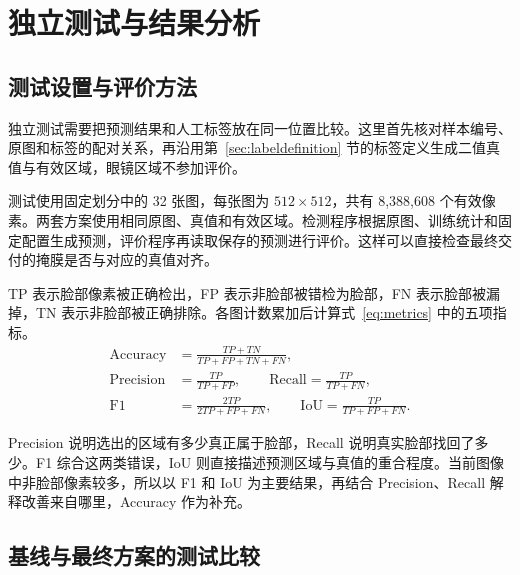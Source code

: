 \section{独立测试与结果分析}
\subsection{测试设置与评价方法}

独立测试需要把预测结果和人工标签放在同一位置比较。这里首先核对样本编号、原图和标签的配对关系，再沿用第~\ref{sec:labeldefinition} 节的标签定义生成二值真值与有效区域，眼镜区域不参加评价。

测试使用固定划分中的 32 张图，每张图为 $512\times512$，共有 8,388,608 个有效像素。两套方案使用相同原图、真值和有效区域。检测程序根据原图、训练统计和固定配置生成预测，评价程序再读取保存的预测进行评价。这样可以直接检查最终交付的掩膜是否与对应的真值对齐。

TP 表示脸部像素被正确检出，FP 表示非脸部被错检为脸部，FN 表示脸部被漏掉，TN 表示非脸部被正确排除。各图计数累加后计算式~\eqref{eq:metrics} 中的五项指标。
\begin{equation}
\begin{aligned}
\mathrm{Accuracy}&=\frac{TP+TN}{TP+FP+TN+FN},\\
\mathrm{Precision}&=\frac{TP}{TP+FP},\qquad
\mathrm{Recall}=\frac{TP}{TP+FN},\\
\mathrm{F1}&=\frac{2TP}{2TP+FP+FN},\qquad
\mathrm{IoU}=\frac{TP}{TP+FP+FN}.
\end{aligned}
\label{eq:metrics}
\end{equation}

Precision 说明选出的区域有多少真正属于脸部，Recall 说明真实脸部找回了多少。F1 综合这两类错误，IoU 则直接描述预测区域与真值的重合程度。当前图像中非脸部像素较多，所以以 F1 和 IoU 为主要结果，再结合 Precision、Recall 解释改善来自哪里，Accuracy 作为补充。

\subsection{基线与最终方案的测试比较}

